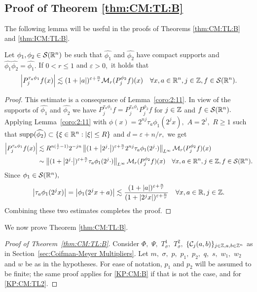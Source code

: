{ 
 \subsection{Proof of Theorem \ref{thm:CM:TL:B}}
 
The following lemma will be useful in the proofs of Theorems \ref{thm:CM:TL:B} and \ref{thm:ICM:TL:B}.

\begin{lemma}\label{lem:pointineq} Let $\phi_1,\phi_2\in {\mathcal{S}}({{\mathbb R}^n})$ be  such that $\widehat{\phi_1}$ and $\widehat{\phi_2}$ have compact supports and  $\widehat{\phi_1}\widehat{\phi_2}=\widehat{\phi_1}.$  If $0<r\le 1$ and $\varepsilon>0,$ it holds that
\begin{align*}
\left\vert P^{\tau_a\phi_1}_{j}f(x) \right\vert\lesssim (1+\left\vert a \right\vert)^{\varepsilon+\frac{n}{r}} \mathcal{M}_r(P^{\phi_2}_{j}f)(x)\quad \forall x,a\in{{\mathbb R}^n}, j\in\mathbb{Z}, f\in{\mathcal{S}}({{\mathbb R}^n}).
\end{align*}
\end{lemma}

\begin{proof} This estimate is a consequence of Lemma~\ref{coro:2:11}. In view of the supports of $\widehat{\phi_1}$ and $\widehat{\phi_2}$ we have $P^{\tau_a\phi_1}_{j}f=P^{\tau_a\phi_1}_{j}P^{\phi_2}_{j}f$ for  $j\in \mathbb{Z} $ and $f\in {\mathcal{S}}({{\mathbb R}^n}).$ Applying Lemma~\ref{coro:2:11} with $\phi(x)=2^{nj}\tau_a \phi_1(2^j x),$ $A=2^j,$ $R\ge 1$ such that ${\rm{supp}}(\widehat{\phi_2})\subset \{\xi\in{{\mathbb R}^n}:\left\vert \xi \right\vert\le R\}$ and $d=\varepsilon+n/r,$ we get
\begin{align*}
\left\vert P^{\tau_a\phi_1}_{j}f(x) \right\vert&\lesssim R^{n(\frac{1}{r}-1)} 2^{-jn}\left\|(1+\left\vert 2^j\cdot \right\vert)^{\varepsilon+\frac{n}{r}}2^{nj}\tau_a \phi_1(2^j\cdot)\right\|_{L^\infty}\mathcal{M}_r(P^{\phi_2}_{j}f)(x)\\
&\sim \left\|(1+\left\vert 2^j\cdot \right\vert)^{\varepsilon+\frac{n}{r}}\tau_a \phi_1(2^j\cdot)\right\|_{L^\infty}\mathcal{M}_r(P^{\phi_2}_{j}f)(x)\quad \forall x,a\in {{\mathbb R}^n}, j\in \mathbb{Z}, f\in{\mathcal{S}}({{\mathbb R}^n}).
\end{align*}
Since $\phi_1\in {\mathcal{S}}({{\mathbb R}^n}),$ 
\[
\left\vert \tau_a \phi_1(2^jx) \right\vert=\left\vert \phi_1(2^j x +a) \right\vert\lesssim \frac{(1+\left\vert a \right\vert)^{\varepsilon+\frac{n}{r}}}{(1+\left\vert 2^jx \right\vert)^{\varepsilon+\frac{n}{r}}}\quad \forall x,a\in \mathbb{R},j\in \mathbb{Z}.
\]
Combining these two estimates completes the proof.
\end{proof}

We now prove Theorem \ref{thm:CM:TL:B}.
 
 \begin{proof}[Proof of Theorem~\ref{thm:CM:TL:B}] Consider $\Phi,$ $\Psi,$ $T_\sigma^1,$ $T_\sigma^2,$ $\{\mathcal{C}_j(a,b)\}_{j\in\mathbb{Z},a,b\in\mathbb{Z}^n}$ as in Section~\ref{sec:Coifman-Meyer Multipliers}. Let $m,$ $\sigma,$ $p,$ $p_1,$ $p_2,$ $q,$ $s,$ $w_1,$ $w_2$ and $w$ be as in the hypotheses.  
For ease of notation, $p_1$ and $p_2$ will be assumed to be finite; the same proof applies for \eqref{KP:CM:B} if that is not the case, and for \eqref{KP:CM:TL2}.



\end{proof}}

